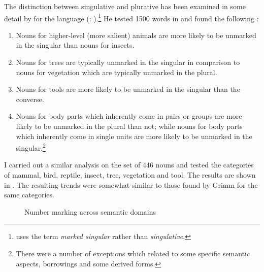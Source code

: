 \documentclass[output=paper]{langsci/langscibook}
\begin{document}
The distinction between singulative and plurative has been examined in some detail by \citet{Grimm2012} for the  language (: ).\footnote{\citet{Grimm2012} uses the term \textit{marked singular} rather than \textit{singulative}.} He tested 1500 words in  and found the following \citep[50]{Grimm2012}:

\begin{enumerate}[label=\roman*.,noitemsep]
\item Nouns for higher-level (more salient) animals are more likely to be unmarked in the singular than nouns for insects. 
\item Nouns for trees are typically unmarked in the singular in comparison to nouns for vegetation which are typically unmarked in the plural. 
\item Nouns for tools are more likely to be unmarked in the singular than the converse. 
\item Nouns for body parts which inherently come in pairs or groups are more likely to be unmarked in the plural than not; while nouns for body parts which inherently come in single units are more likely to be unmarked in the singular.\footnote{There were a number of exceptions which related to some specific semantic aspects, borrowings and some derived forms.}
\end{enumerate}

I carried out a similar analysis on the set of 446  nouns and tested the categories of mammal, bird, reptile, insect, tree, vegetation and tool. The results are shown in . The resulting trends were somewhat similar to those found by Grimm for the same categories. 

\begin{figure}
\caption{Number marking across semantic domains}
\label{fig:moodie:1}
\end{figure}
\end{document}
